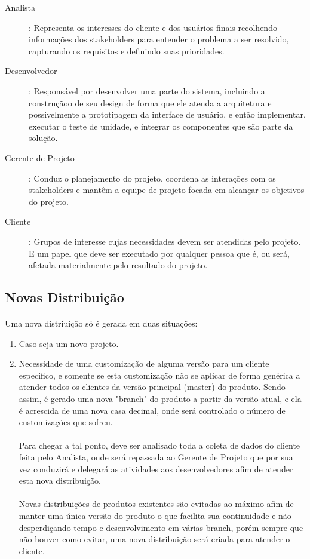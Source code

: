 \documentclass[	DIV=calc,%
							paper=a4,%
							fontsize=12pt,%
							onecolumn]{scrartcl}	 					%
\begin{document}
\begin{description}
	\item[Analista]: Representa os interesses do cliente e dos usuários finais recolhendo informações dos stakeholders para entender o problema a ser resolvido, capturando os requisitos e definindo suas prioridades.
	\item[Desenvolvedor]: Responsável por desenvolver uma parte do sistema, incluindo a construçãoo de seu design de forma que ele atenda a arquitetura e possivelmente a prototipagem da interface de usuário, e então implementar, executar o teste de unidade, e integrar os componentes que são parte da solução.
	\item[Gerente de Projeto]: Conduz o planejamento do projeto, coordena as interações com os stakeholders e mantêm a equipe de projeto focada em alcançar os objetivos do projeto.
	\item[Cliente]: Grupos de interesse cujas necessidades devem ser atendidas pelo projeto. E um papel que deve ser executado por qualquer pessoa que é, ou será, afetada materialmente pelo resultado do projeto.
\end{description}

\subsection{Novas Distribuição}
\paragraph{}
Uma nova distriuição só é gerada em duas situações:
\begin{enumerate}
	\item Caso seja um novo projeto.
	\item Necessidade de uma customização de alguma versão para um cliente especifico, e somente se esta customização não se aplicar de forma genérica a atender todos os clientes da versão principal (master) do produto. Sendo assim, é gerado uma nova "branch" do produto a partir da versão atual, e ela é acrescida de uma nova casa decimal, onde será controlado o número de customizações que sofreu. 
	\paragraph{}
	Para chegar a tal ponto, deve ser analisado toda a coleta de dados do cliente feita pelo Analista, onde será repassada ao Gerente de Projeto que por sua vez conduzirá e delegará as atividades aos desenvolvedores afim de atender esta nova distribuição.
	\paragraph{}
	Novas distribuições de produtos existentes são evitadas ao máximo afim de manter uma única versão do produto o que facilita sua continuidade e não desperdiçando tempo e desenvolvimento em várias branch, porém sempre que não houver como evitar, uma nova distribuição será criada para atender o cliente.
\end{enumerate}
\end{document}
